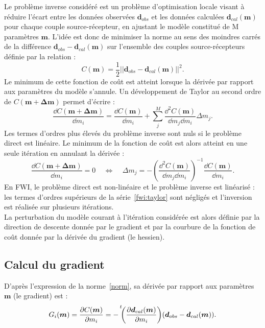 Le problème inverse considéré est un problème d'optimisation locale visant à réduire l'écart entre les données observées $\bm{d}_{obs}$ et les données calculées $\bm{d}_{cal}(\bm{m})$ pour chaque couple source-récepteur, en ajustant le modèle constitué de M paramètres $\bm{m}$. L'idée est donc de minimiser la norme au sens des moindres carrés de la différence $\bm{d}_{obs}-\bm{d}_{cal}(\bm{m})$ sur l'ensemble des couples source-récepteurs définie par la relation : 
\begin{equation}
	C(\bm{m})=\frac{1}{2}||\bm{d}_{obs}-\bm{d}_{cal}(\bm{m})||^{2}\text{.}
	\label{norm}
\end{equation}
 Le minimum de cette fonction de coût est atteint lorsque la dérivée par rapport aux paramètres du modèle s'annule. Un développement de Taylor au second ordre de $C(\bm{m}+ \bm{\Delta m})$ permet d'écrire : 
 \begin{equation}
 	\frac{\dd C(\bm{m}+\bm{\Delta m})}{\dd m_{i}}= \frac{\dd C(\bm{m})}{\dd m_{i}} + \displaystyle\sum_{j}^{M} \frac{\dd^{2} C(\bm{m})}{\dd m_{j} \dd m_{i}}\Delta m_{j}\text{.}
 	\label{fwi:taylor}
 \end{equation}
Les termes d'ordres plus élevés du problème inverse sont nuls si le problème direct est linéaire. Le minimum de la fonction de coût est alors atteint en une seule itération en annulant la dérivée : 
\begin{equation}
	\frac{\dd C(\bm{m}+\bm{\Delta m})}{\dd m_{i}} = 0 ~~~~~\Leftrightarrow ~~~~~ \Delta m _{j} = -\left( \frac{\dd ^{2} C(\bm{m})}{\dd m_{j} \dd m_{i} }\right)^{-1} \frac{\dd C (\bm{m})}{\dd m_{i}} \text{.}
\end{equation}
En FWI, le problème direct est non-linéaire et le problème inverse est linéarisé : les termes d'ordres supérieurs de la série~\ref{fwi:taylor} sont négligés et l'inversion est réalisée sur plusieurs itérations.\\
La perturbation du modèle courant à l'itération considérée est alors définie par la direction de descente donnée par le gradient et par la courbure de la fonction de coût donnée par la dérivée du gradient (le hessien).



\subsection{Calcul du gradient}

D'après l'expression de la norme~\ref{norm}, sa dérivée par rapport aux paramètres $\bm{m}$ (le gradient) est : 
\begin{equation}
	 G_{i}(\bm{m})=\frac{\dd C (\bm{m})}{\dd m_{i}} = -\tr{\left( \frac{\dd \bm{d}_{cal}(\bm{m}) }{\dd m_{i}} \right)} ( \bm{d}_{obs} - \bm{d}_{cal}(\bm{m})) \text{.}
	 \label{eq_grad}
\end{equation}\\



